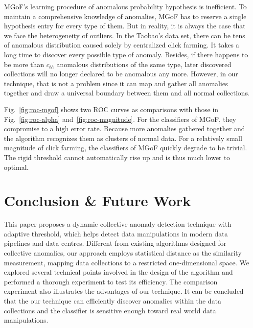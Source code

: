 \documentclass[10pt,conference,letterpaper]{IEEEtran}
\begin{document}
		
		MGoF's learning procedure of anomalous probability hypothesis is inefficient. To maintain a comprehensive knowledge of anomalies, MGoF has to reserve a single hypothesis entry for every type of them. But in reality, it is always the case that we face the heterogeneity of outliers. In the Taobao's data set, there can be tens of anomalous distribution caused solely by centralized click farming. It takes a long time to discover every possible type of anomaly. Besides, if there happens to be more than $c_{th}$ anomalous distributions of the same type, later discovered collections will no longer declared to be anomalous any more.
		However, in our technique, that is not a problem since it can map and gather all anomalies together and draw a universal boundary between them and all normal collections.
	
		Fig.~\ref{fig:roc-mgof} shows two ROC curves as comparisons with those in Fig.~\ref{fig:roc-alpha} and~\ref{fig:roc-magnitude}. For the classifiers of MGoF, they  compromise to a high error rate. Because more anomalies gathered together and the algorithm recognizes them as clusters of normal data.
		For a relatively small magnitude of click farming, the classifiers of MGoF quickly degrade to be trivial. The rigid threshold cannot automatically rise up and is thus much lower to optimal.
			
	\section{Conclusion \& Future Work}\label{sec:conclusion}
		This paper proposes a dynamic collective anomaly detection technique with adaptive threshold, which helps detect data manipulations in modern data pipelines and data centres. Different from existing algorithms designed for collective anomalies, our approach employs statistical distance as the similarity measurement, mapping data collections to a restricted one-dimensional space. We explored several technical points involved in the design of the algorithm and performed a thorough experiment to test its efficiency. The comparison experiment also illustrates the advantages of our technique. It can be concluded that the our technique can efficiently discover anomalies within the data collections and the classifier is sensitive enough toward real world data manipulations. 
		






\end{document}
